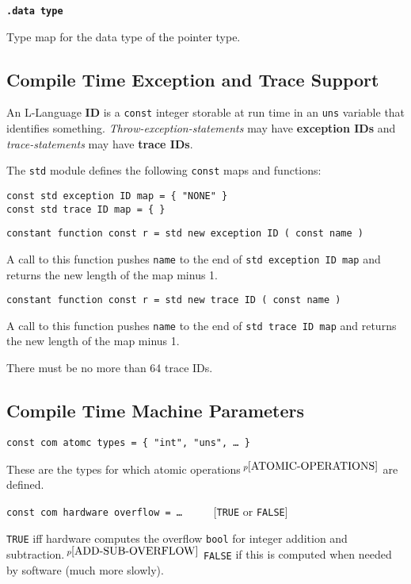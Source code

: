 \documentclass[12pt]{article}
\newcommand{\key}[1]{{\rm \bfseries #1}}
\newcommand{\ttkey}[1]{{\tt \bfseries #1}}
\newcommand{\skey}[2]{{\rm \bfseries #1#2}}
\newcommand{\pagnote}[1]{$\,^{p\pageref{#1}}$}
\newenvironment{indpar}[1][0.3in]%
	{\begin{list}{}%
		     {\setlength{\itemsep}{0in}%
		      \setlength{\topsep}{0in}%
		      \setlength{\parsep}{1ex}%
		      \setlength{\labelwidth}{#1}%
		      \setlength{\leftmargin}{#1}%
		      \addtolength{\leftmargin}{\labelsep}}%
	 \item}%
	{\end{list}}
\begin{document}
\ttkey{.data type}
\begin{indpar}
Type map for the data type of the pointer type.
\end{indpar}

\subsection{Compile Time Exception and Trace Support}
\label{COMPILE-TIME-EXCEPTION-AND-TRACE-SUPPORT}

An L-Language \key{ID} is a {\tt const} integer storable
at run time in an {\tt uns} variable that identifies something.
{\em Throw-exception-statements} may have \skey{exception ID}s
and {\em trace-statements} may have \skey{trace ID}s.

The {\tt std} module defines the following {\tt const} maps and functions:

{\tt const std exception ID map = \{ "NONE" \} } \\
{\tt const std trace ID map = \{ \}}

{\tt constant function const r = std new exception ID ( const name ) }%
\label{NEW-EXCEPTION-ID}
\begin{indpar}
A call to this function pushes {\tt name} to the end of
{\tt std exception ID map} and returns the new length of the map minus 1.
\end{indpar}

{\tt constant function const r = std new trace ID ( const name ) }%
\label{NEW-TRACE-ID}
\begin{indpar}
A call to this function pushes {\tt name} to the end of
{\tt std trace ID map} and returns the new length of the map minus 1.

There must be no more than 64 trace IDs.

\end{indpar}


\subsection{Compile Time Machine Parameters}

{\tt const com atomc types = \{ "int", "uns", \ldots{} \}}%
\label{ATOMIC-TYPES}
\begin{indpar}
These are the types for which atomic operations\pagnote{ATOMIC-OPERATIONS}
are defined.
\end{indpar}

{\tt const com hardware overflow = \ldots{}} ~~~~~[{\tt TRUE} or {\tt FALSE}]%
\label{HARDWARE-OVERFLOW}
\begin{indpar}
{\tt TRUE} iff hardware computes the overflow {\tt bool} for integer
addition and subtraction.\pagnote{ADD-SUB-OVERFLOW}
{\tt FALSE} if this is computed when needed by software
(much more slowly).
\end{indpar}
\end{document}
